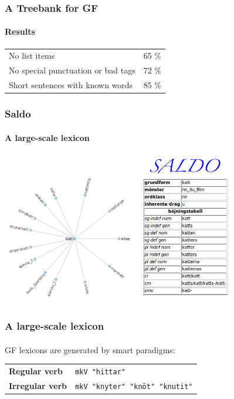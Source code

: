 \documentclass[10pt]{beamer}
\begin{document}
\begin{frame}[containsverbatim]
\frametitle{A Treebank for GF}
\framesubtitle{Results} 
\begin{tabular}{ll}
No list items & 65 \%\\
No special punctuation or bad tags& 72 \%\\
Short sentences with known words & 85 \%\\
\end{tabular}
\end{frame}
\begin{frame}
\frametitle{Saldo}
\framesubtitle{A large-scale lexicon}
\includegraphics[width=60mm]{saldograph.png}
\includegraphics[width=40mm]{saldotab.png}
\end{frame}


\begin{frame}[containsverbatim]
\frametitle{A large-scale lexicon}
\framesubtitle{} 
GF lexicons are generated by smart paradigms: \\
\vspace{5mm}
\begin{tabular}{ll}
\textbf{Regular verb} & \verb-mkV "hittar"- \\
\textbf{Irregular verb} &  \verb-mkV "knyter" "knöt" "knutit"- \\
\end{tabular}
\end{frame}
\end{document}
